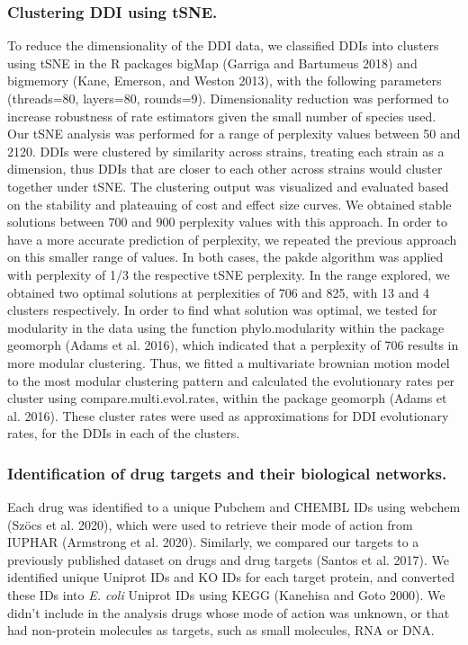\documentclass[
]{article}
\begin{document}
\hypertarget{clustering-ddi-using-tsne.}{%
\subsubsection{Clustering DDI using tSNE.}\label{clustering-ddi-using-tsne.}}

To reduce the dimensionality of the DDI data, we classified DDIs into clusters using tSNE in the R packages bigMap (Garriga and Bartumeus 2018) and bigmemory (Kane, Emerson, and Weston 2013), with the following parameters (threads=80, layers=80, rounds=9). Dimensionality reduction was performed to increase robustness of rate estimators given the small number of species used. Our tSNE analysis was performed for a range of perplexity values between 50 and 2120. DDIs were clustered by similarity across strains, treating each strain as a dimension, thus DDIs that are closer to each other across strains would cluster together under tSNE. The clustering output was visualized and evaluated based on the stability and plateauing of cost and effect size curves. We obtained stable solutions between 700 and 900 perplexity values with this approach. In order to have a more accurate prediction of perplexity, we repeated the previous approach on this smaller range of values. In both cases, the pakde algorithm was applied with perplexity of 1/3 the respective tSNE perplexity. In the range explored, we obtained two optimal solutions at perplexities of 706 and 825, with 13 and 4 clusters respectively. In order to find what solution was optimal, we tested for modularity in the data using the function phylo.modularity within the package geomorph (Adams et al. 2016), which indicated that a perplexity of 706 results in more modular clustering. Thus, we fitted a multivariate brownian motion model to the most modular clustering pattern and calculated the evolutionary rates per cluster using compare.multi.evol.rates, within the package geomorph (Adams et al. 2016). These cluster rates were used as approximations for DDI evolutionary rates, for the DDIs in each of the clusters.

\hypertarget{identification-of-drug-targets-and-their-biological-networks.}{%
\subsubsection{Identification of drug targets and their biological networks.}\label{identification-of-drug-targets-and-their-biological-networks.}}

Each drug was identified to a unique Pubchem and CHEMBL IDs using webchem (Szöcs et al. 2020), which were used to retrieve their mode of action from IUPHAR (Armstrong et al. 2020). Similarly, we compared our targets to a previously published dataset on drugs and drug targets (Santos et al. 2017). We identified unique Uniprot IDs and KO IDs for each target protein, and converted these IDs into \emph{E. coli} Uniprot IDs using KEGG (Kanehisa and Goto 2000). We didn't include in the analysis drugs whose mode of action was unknown, or that had non-protein molecules as targets, such as small molecules, RNA or DNA.
\end{document}

